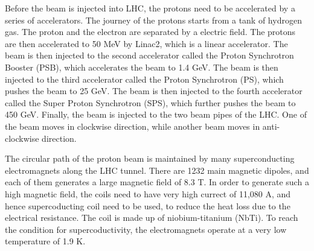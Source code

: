 Before the beam is injected into LHC, the protons need to be accelerated by a series of accelerators.
The journey of the protons starts from a tank of hydrogen gas.
The proton and the electron are separated by a electric field.
The protons are then accelerated to 50 MeV by Linac2, which is a linear accelerator.
The beam is then injected to the second accelerator called the Proton Synchrotron Booster (PSB), which accelerates the beam to 1.4 GeV.
The beam is then injected to the third accelerator called the Proton Synchrotron (PS), which pushes the beam to 25 GeV.
The beam is then injected to the fourth accelerator called the Super Proton Synchrotron (SPS), which further pushes the beam to 450 GeV.
Finally, the beam is injected to the two beam pipes of the LHC.
One of the beam moves in clockwise direction, while another beam moves in anti-clockwise direction.
\cite{accelerator}

The circular path of the proton beam is maintained by many superconducting electromagnets along the LHC tunnel.
There are 1232 main magnetic dipoles, and each of them generates a large magnetic field of 8.3 T.
In order to generate such a high magnetic field, the coils need to have very high currect of 11,080 A, and hence supercoducting coil need to be used, to reduce the heat loss due to the electrical resistance.
The coil is made up of niobium-titanium (NbTi).
To reach the condition for supercoductivity, the electromagnets operate at a very low temperature of 1.9 K.
\cite{supermagnet,cryogenics}


